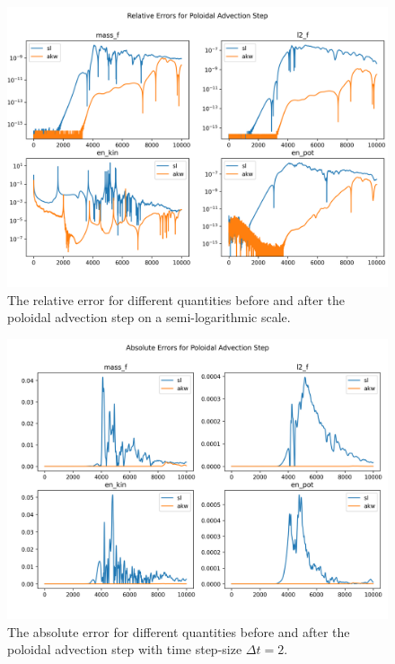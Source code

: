 \begin{figure}
	\centering
	\includegraphics[width=0.9\linewidth]{rel_err_log}
	\caption{The relative error for different quantities before and after the poloidal advection step on a semi-logarithmic scale.}
	\label{fig:relerrlog}
\end{figure}


\begin{figure}
	\centering
	\includegraphics[width=0.9\linewidth]{abs_err dt2}
	\caption{The absolute error for different quantities before and after the poloidal advection step with time step-size $\Delta t = 2$.}
	\label{fig:abserr_dt2}
\end{figure}


